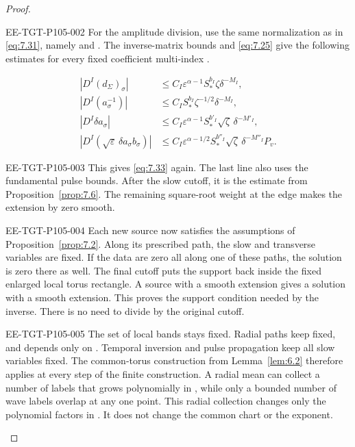 \begin{proof}
\begin{EESegment}{EE-TGT-P105-002}
For the amplitude division, use the same normalization as in \eqref{eq:7.31}, namely
 and
. The inverse-matrix bounds and
\eqref{eq:7.25} give the following estimates for every fixed coefficient multi-index
.
\end{EESegment}
\[
\begin{aligned}
|D^I(d_\Sigma)_\sigma|
 &\le C_I\varepsilon^{\alpha-1}S_*^{b_I}\zeta\delta^{-M_I},\\
|D^I(a_\sigma^{-1})|
 &\le C_I S_*^{b_I}\zeta^{-1/2}\delta^{-M_I},\\
|D^I\delta a_\sigma|
 &\le C_I\varepsilon^{\alpha-1}S_*^{b'_I}\sqrt\zeta\,\delta^{-M'_I},\\
|D^I(\sqrt\varepsilon\,\delta a_\sigma b_\sigma)|
 &\le C_I\varepsilon^{\alpha-1/2}S_*^{b''_I}\sqrt\zeta\,\delta^{-M''_I}P_v.
\end{aligned}
\]
\begin{EESegment}{EE-TGT-P105-003}
This gives \eqref{eq:7.33} again. The last line also uses the fundamental pulse bounds. After the slow
cutoff, it is the  estimate from
Proposition~\ref{prop:7.6}. The remaining square-root weight at the edge makes the extension by zero
smooth.
\end{EESegment}

\begin{EESegment}{EE-TGT-P105-004}
Each new source now satisfies the assumptions of Proposition~\ref{prop:7.2}. Along its prescribed
path, the slow and transverse variables are fixed. If the data are zero all along one of these
paths, the solution is zero there as well. The final cutoff puts the support back inside the fixed
enlarged local torus rectangle. A source with a smooth extension gives a solution with a smooth
extension. This proves the support condition needed by the inverse. There is no need to divide by
the original cutoff.
\end{EESegment}

\begin{EESegment}{EE-TGT-P105-005}
The set of local bands stays fixed. Radial paths keep  fixed, and
 depends only on . Temporal inversion and pulse
propagation keep all slow variables fixed. The common-torus construction from Lemma~\ref{lem:6.2}
therefore applies at every step of the finite construction. A radial mean can collect a number of
labels that grows polynomially in , while only a bounded number of wave
labels overlap at any one point. This radial collection changes only the polynomial factors in
. It does not change the common chart or the
 exponent.
\end{EESegment}


\end{proof}
